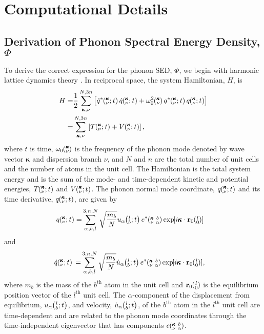 \chapter{\label{Appendix_A}Computational Details}

\section{\label{Appendix_A:Derivation}
Derivation of Phonon Spectral Energy Density, $\Phi$}

To derive the correct expression for the phonon SED, $\Phi$, we begin 
with harmonic lattice dynamics theory \cite{wallace_thermodynamics_1972,
dove_introduction_1993}. In reciprocal space, the system Hamiltonian, 
$H$, is
\begin{equation}\label{E:H_HLD}
\begin{split}
H=&\frac{1}{2}\SUM{}{}\left[\dot{q}^*\kvt \dot{q}\kvt + \omega_0^2\kv 
q^*\kvt q\kvt\right]\\
 =&\SUM{}{}\left[T\kvt + V\kvt\right],
\end{split}
\end{equation}
where $t$ is time, $\omega_0\mspace{-4.0mu}\left(\mspace{-8.0mu} \begin{smallmatrix}&\pmb{\kappa} \\&\nu\end{smallmatrix} \mspace{-3.0mu}\right)$ is the frequency of the phonon mode 
denoted by
wave vector $\pmb{\kappa}$ and dispersion branch $\nu$, and $N$ and 
$n$ are
the total number of unit cells and the number of atoms in the unit cell.
The
Hamiltonian is the total system energy and is the sum of the mode- and
time-dependent kinetic and potential energies, $T\mspace{-4.0mu}\left(\mspace{-8.0mu} \begin{smallmatrix}&\pmb{\kappa} \\&\nu\end{smallmatrix} \mspace{-2.0mu};t\right)$ and $V\mspace{-4.0mu}\left(\mspace{-8.0mu} \begin{smallmatrix}&\pmb{\kappa} \\&\nu\end{smallmatrix} \mspace{-2.0mu};t\right)$.
The
phonon normal mode coordinate, $q\mspace{-4.0mu}\left(\mspace{-8.0mu} \begin{smallmatrix}&\pmb{\kappa} \\&\nu\end{smallmatrix} \mspace{-2.0mu};t\right)$ and its time derivative, 
$q\mspace{-4.0mu}\left(\mspace{-8.0mu} \begin{smallmatrix}&\pmb{\kappa} \\&\nu\end{smallmatrix} \mspace{-2.0mu};t\right)$, are given by
\begin{equation}\label{A:E:q_HLD}
\begin{split}
q\kvt=&\SUM{0}{}\sqrt{\frac{m_b}{N}}u_{\alpha}\lbt e^*\kvba
\EXP{i\pmb{\kappa}\cdot\mathbf{r}_0\ab{l}{0}}
\end{split}
\end{equation}
and
\begin{equation}\label{A:E:qdot_HLD}
\begin{split}
\dot{q}\kvt{}{}{}=&\SUM{0}{}\sqrt{\frac{m_b}{N}}\dot{u}_{\alpha}\lbt
e^*\kvba\EXP{i\pmb{\kappa}\cdot\mathbf{r}_0\ab{l}{0}},
\end{split}
\end{equation}
where $m_b$ is the mass of the $b^{\textrm{th}}$ atom in the unit 
cell and
$\mathbf{r}_0\ab{l}{0}$ is the equilibrium position vector of the
$l^{\textrm{th}}$ unit cell. The $\alpha$-component of the displacement 
from
equilibrium, $u_{\alpha}\mspace{-4.0mu}\left(\mspace{-8.0mu} \begin{smallmatrix}&l \\&b\end{smallmatrix}\mspace{-2.0mu};t\right)$, and velocity, $\dot{u}_{\alpha}\mspace{-4.0mu}\left(\mspace{-8.0mu} \begin{smallmatrix}&l \\&b\end{smallmatrix}\mspace{-2.0mu};t\right)$, 
of the
$b^{\textrm{th}}$ atom in the $l^{\textrm{th}}$ unit cell are 
time-dependent
and are related to the phonon mode coordinates through the 
time-independent
eigenvector that has components $e\mspace{-4.0mu}\left(\mspace{-8.0mu} \begin{smallmatrix} &\pmb{\kappa} &b \\ &\nu &\alpha\end{smallmatrix} \mspace{-3.0mu}\right)$. 


